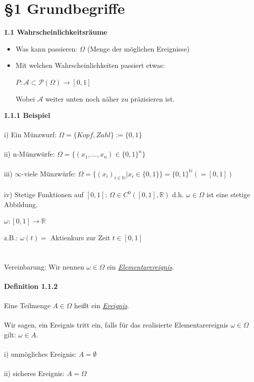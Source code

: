 \documentclass[10pt,a4paper]{report}
\numberwithin{equation}{section}
\numberwithin{figure}{section}
\theoremstyle{plain}
\theoremstyle{definition}
\theoremstyle{plain}
\theoremstyle{definition}
\theoremstyle{remark}
\theoremstyle{plain}
\theoremstyle{plain}
\theoremstyle{plain}
\newcommand{\1}{ \mathbb{1} } %
\begin{document}
\chapter*{\S 1 \qquad Grundbegriffe}
\Large{\textbf{1.1 Wahrscheinlichkeitsräume}}\normalsize
\begin{itemize}
\item Was kann passieren: $\Omega$ (Menge der möglichen Ereignisse)
\item Mit welchen Wahrscheinlichkeiten passiert etwas:
\begin{center}
$P: \mathcal{A} \subset \mathcal{P}(\Omega) \rightarrow [0,1]$
\end{center}
Wobei $\mathcal{A}$ weiter unten noch näher zu präzisieren ist.
\end{itemize}
\textbf{1.1.1 Beispiel}\\\\
i) Ein Münzwurf: $\Omega=\{Kopf, Zahl\}:=\{0,1\}$\\\\
ii) n-Münzwürfe: $\Omega=\{(x_1,\dots,x_n) \in \{0,1\}^n\}$\\\\
iii) $\infty$-viele Münzwürfe: $\Omega=\{(x_i)_{i\in \mathbb{N}}|x_i \in \{0,1\}\}=\{0,1\}^\mathbb{N}(=[0,1])$\\\\
iv) Stetige Funktionen auf $[0,1]$: $\Omega \in C^0([0,1],\mathbb{R})$ d.h. $\omega \in \Omega$ ist eine stetige Abbildung.
\begin{center}
$\omega: [0,1] \rightarrow \mathbb{R}$
\end{center}
z.B.: $\omega(t)=$ Aktienkurs zur Zeit $t \in [0,1]$\\\\\\
Vereinbarung: Wir nennen $\omega \in \Omega$ ein \underline{\textit{Elementarereignis}}.\\\\
\textbf{Definition 1.1.2}\\\\
Eine Teilmenge $A \in \Omega$ heißt ein \underline{\textit{Ereignis}}.\\\\
Wir sagen, ein Ereignis tritt ein, falls für das realisierte Elementarereignis $\omega \in \Omega$ gilt: $\omega \in A$.\\\\
i) unmögliches Ereignis: $A=\emptyset$\\\\
ii) sicheres Ereignis: $A=\Omega$\\\\
\end{document}
